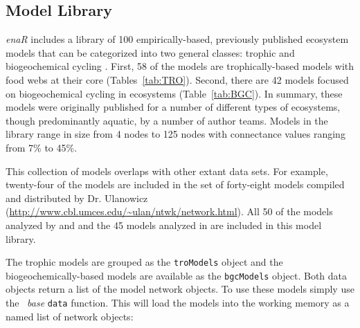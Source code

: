 \documentclass[article]{jss}
\newcommand{\R}{\proglang{R}}
\begin{document}
\subsection{Model Library}

\textit{enaR} includes a library of 100 empirically-based, previously
published ecosystem models that can be categorized into two general
classes: trophic and biogeochemical cycling \citep{christian96,
  baird08_sylt, borrett10_idd, borrett15_bgc}.  First, 58 of the
models are trophically-based models with food webs at their core
(Tables~\ref{tab:TRO}).  Second, there are 42 models focused on
biogeochemical cycling in ecosystems (Table~\ref{tab:BGC}).  In
summary, these models were originally published for a number of
different types of ecosystems, though predominantly aquatic, by a
number of author teams.  Models in the library range in size from 4
nodes to 125 nodes with connectance values ranging from 7\% to 45\%.

This collection of models overlaps with other extant data sets.  For
example, twenty-four of the models are included in the set of forty-eight
models compiled and distributed by Dr. Ulanowicz
(\url{http://www.cbl.umces.edu/~ulan/ntwk/network.html}).  All 50 of
the models analyzed by \citet{borrett10_hmg} and \citet{salas11_did}
and the 45 models analyzed in \citet{borrett13} are included in this
model library.

The trophic models are grouped as the \texttt{troModels} object and
the biogeochemically-based models are available as the
\texttt{bgcModels} object.  Both data objects return a list of the
model network objects.  To use these models simply use the \R\
\textit{base} \texttt{data} function. This will load the models into
the working memory as a named list of network objects:
\end{document}
